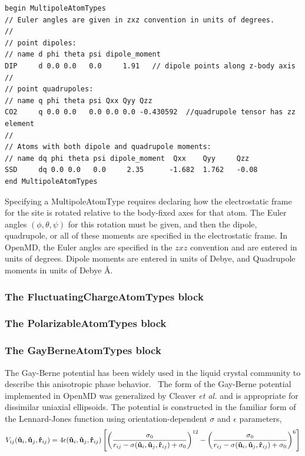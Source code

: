 \documentclass[]{book}
\begin{document}
\begin{lstlisting}[caption={[An example of a MultipoleAtomTypes block.] A
simple example of a MultipoleAtomTypes block.   Dipoles are given in
units of Debyes, and Quadrupole moments are given in units of Debye
\AA~(or $10^{-26} \mathrm{~esu~cm}^2$)},
label={sch:MultipoleAtomTypesBlock}]
begin MultipoleAtomTypes
// Euler angles are given in zxz convention in units of degrees.
//
// point dipoles:
// name d phi theta psi dipole_moment
DIP     d 0.0 0.0   0.0     1.91   // dipole points along z-body axis
//
// point quadrupoles:
// name q phi theta psi Qxx Qyy Qzz
CO2     q 0.0 0.0   0.0 0.0 0.0 -0.430592  //quadrupole tensor has zz element
//
// Atoms with both dipole and quadrupole moments:
// name dq phi theta psi dipole_moment  Qxx    Qyy     Qzz
SSD     dq 0.0 0.0   0.0     2.35      -1.682  1.762   -0.08
end MultipoleAtomTypes
\end{lstlisting}

Specifying a MultipoleAtomType requires declaring how the
electrostatic frame for the site is rotated relative to the body-fixed
axes for that atom. The Euler angles $(\phi, \theta, \psi)$ for this
rotation must be given, and then the dipole, quadrupole, or all of
these moments are specified in the electrostatic frame.  In OpenMD,
the Euler angles are specified in the $zxz$ convention and are entered
in units of degrees.  Dipole moments are entered in units of Debye,
and Quadrupole moments in units of Debye \AA.

\subsubsection{\label{section:ffGB}The FluctuatingChargeAtomTypes  block}
\subsubsection{\label{section:ffPol}The PolarizableAtomTypes block}
\subsubsection{\label{section:ffGB}The GayBerneAtomTypes block}

The Gay-Berne potential has been widely used in the liquid crystal
community to describe this anisotropic phase
behavior.~\cite{Gay:1981yu,Berne:1972pb,Kushick:1976xy,Luckhurst:1990fy,Cleaver:1996rt}
The form of the Gay-Berne potential implemented in OpenMD was
generalized by Cleaver {\it et al.} and is appropriate for dissimilar
uniaxial ellipsoids.\cite{Cleaver:1996rt}  The potential is constructed in the
familiar form of the Lennard-Jones function using
orientation-dependent $\sigma$ and $\epsilon$ parameters,
\begin{equation*}
V_{ij}({{\bf \hat u}_i}, {{\bf \hat u}_j}, {{\bf \hat
r}_{ij}}) = 4\epsilon ({{\bf \hat u}_i}, {{\bf \hat u}_j},
{{\bf \hat r}_{ij}})\left[\left(\frac{\sigma_0}{r_{ij}-\sigma({{\bf \hat u
}_i},
{{\bf \hat u}_j}, {{\bf \hat r}_{ij}})+\sigma_0}\right)^{12}
-\left(\frac{\sigma_0}{r_{ij}-\sigma({{\bf \hat u}_i}, {{\bf \hat u}_j},
{{\bf \hat r}_{ij}})+\sigma_0}\right)^6\right]
\label{eq:gb}
\end{equation*}
\end{document}
